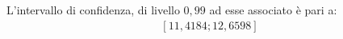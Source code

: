 L'intervallo di confidenza, di livello $0,99$ ad esse associato è pari a:
\begin{equation}
	\label{eq:intervallo_confidenza_num_malattia}
	\begin{split}
		\left [ 11,4184 ; 12,6598 \right]	 
	\end{split}
\end{equation}
\begin{comment}
%
%
\begin{savenotes}
\begin{table}[htb]
\centering
 \caption{Numero contratti 29 centralinisti}
 \begin{tabular}{p{5cm}D{,}{,}{5.2}}
 \toprule
 	& \multicolumn{1}{c}{\textbf{Quantità}} \\
 \midrule 		
	\makebox[5cm][r]{Numero chiamate annuali} & 605\thinspace 172,00\\
 	\makebox[5cm][r]{Numero contratti annuali} & 94\thinspace 406,83 \\
 	\makebox[5cm][r]{Numero contratti mensili} & 7\thinspace 867,24\\  	
 \bottomrule
 \end{tabular} 
\end{table}
\end{savenotes}



\begin{savenotes}
\begin{table}[htb]
\centering
 \caption{Numero contratti centralinisti}
 \begin{tabular}{p{7cm}D{,}{,}{5.2}D{,}{,}{5.2}}
 \toprule
 	& \multicolumn{1}{c}{\textbf{Singolo Centralinista}} & \multicolumn{1}{c}{\textbf{29 Centralinisti}} \\
 \midrule 		
	\makebox[7cm][r]{Numero chiamate giornaliere} & 94,00 & 2820\\
 	\makebox[7cm][r]{Numero chiamate mensili} & 1739,00\footnote{(94,00*18,50)} & 52170\\
 	\makebox[7cm][r]{Contratti stipulati mensilmente} & 271,29 & 8138,52\\ 	
 	\makebox[7cm][r]{Chiamate mensili in caso di assenza per 12 giorni} & 611,00\footnote{(94,00*(18,50-12,00))} & 18330\\
 	\makebox[7cm][r]{Contratti stipulati in caso di assenza per 12 giorni} & 95,32\footnote{(611*0,156)} & 2859,48\\ 	
 \bottomrule
 \end{tabular} 
\end{table}
\end{savenotes}
 

\end{comment}
